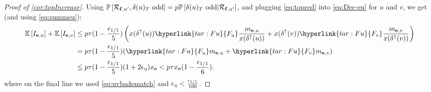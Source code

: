 \begin{proof}[Proof of \cref{cor:topIncrease}]
Using ${\mathbb{P}}\left[{\mathcal{R}}_{{\bf f},u'},\delta(u)_T\text{ odd}\right]=p{\mathbb{P}}\left[\delta(u)_T\text{ odd}|{\mathcal{R}}_{{\bf f},u'}\right]$, and plugging  \eqref{eq:topred}  into \eqref{eq:Dec-eu} for $u$ and $v$, we get (and using \cref{eq:summeu}):
\begin{align}
\label{eq:DegreeCutPayment}
\E{I_{\bbe,u}}+ \E{I_{\bbe,v}} &\le p \tau(1-\frac{\eps_{1/1}}{5}) \left(x(\delta^\uparrow(u)) \hyperlink{tar:Fu}{F_u}\frac{m_{\bbe,u}}{x(\delta^\uparrow(u))} +  x(\delta^\uparrow(v)) \hyperlink{tar:Fu}{F_v} \frac{m_{\bbe,v}}{x(\delta^\uparrow(v))}\right)\\
&=  p \tau (1-\frac{\eps_{1/1}}{5}) (\hyperlink{tar:Fu}{F_u}m_{\bbe,u}
+\hyperlink{tar:Fu}{F_v} m_{\bbe,v})\notag\\
& \le p\tau(1-\frac{\eps_{1/1}}{5}) (1 + 2\eps_\eta) x_\bbe < p\tau x_\bbe (1- \frac{\eps_{1/1}}{6}).\notag
\end{align}
where on the final line we used \eqref{eq:uvbadematch} and ${\epsilon}_{\eta} < \frac{{\epsilon}_{1/1}}{100}$.
\end{proof}











